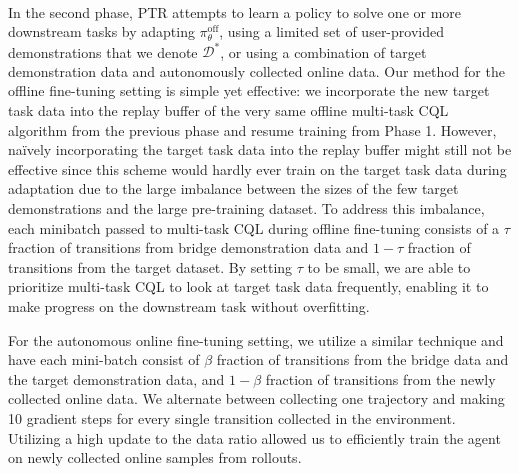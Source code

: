 ~

 In the second phase, PTR attempts to learn a policy to solve one or more downstream tasks by adapting $\pi^\text{off}_\theta$, using a limited set of user-provided demonstrations that we denote $\mathcal{D}^*$, or using a combination of target demonstration data and autonomously collected online data. Our method for the offline fine-tuning setting is simple yet effective: we incorporate the new target task data into the replay buffer of the very same offline multi-task CQL algorithm from the previous phase and resume training from Phase 1. However, na\"ively incorporating the target task data into the replay buffer might still not be effective since this scheme would hardly ever train on the target task data during adaptation due to the large imbalance between the sizes of the few target demonstrations and the large pre-training dataset. To address this imbalance, each minibatch passed to multi-task CQL during offline fine-tuning consists of a $\tau$ fraction of transitions from bridge demonstration data and $1 - \tau$ fraction of transitions from the target dataset. By setting $\tau$ to be small, we are able to prioritize multi-task CQL to look at target task data frequently, enabling it to make progress on the downstream task without overfitting.

For the autonomous online fine-tuning setting, we utilize a similar technique and have each mini-batch consist of $\beta$ fraction of transitions from the bridge data and the target demonstration data, and $1 - \beta$ fraction of transitions from the newly collected online data. We alternate between collecting one trajectory and making 10 gradient steps for every single transition collected in the environment. Utilizing a high update to the data ratio allowed us to efficiently train the agent on newly collected online samples from rollouts.

